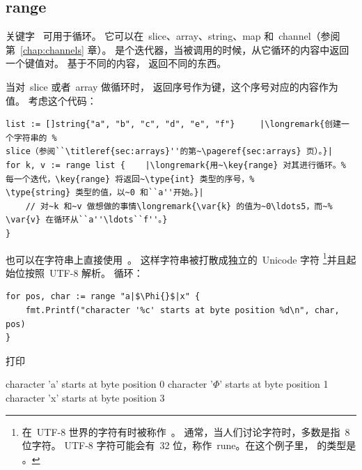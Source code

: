 \subsection{range}
关键字~ 可用于循环。
它可以在~slice、array、string、map 和~channel（参阅第~\ref{chap:channels} 章）。
 是个迭代器，当被调用的时候，从它循环的内容中返回一个键值对。
基于不同的内容， 返回不同的东西。

当对~slice 或者~array 做循环时， 返回序号作为键，这个序号对应的内容作为值。
考虑这个代码：
\begin{lstlisting}
list := []string{"a", "b", "c", "d", "e", "f"}     |\longremark{创建一个字符串的 %
slice（参阅``\titleref{sec:arrays}''的第~\pageref{sec:arrays} 页）。}|
for k, v := range list {	|\longremark{用~\key{range} 对其进行循环。%
每一个迭代，\key{range} 将返回~\type{int} 类型的序号，%
\type{string} 类型的值，以~0 和``a''开始。}|
    // 对~k 和~v 做想做的事情\longremark{\var{k} 的值为~0\ldots5，而~%
\var{v} 在循环从``a''\ldots``f''。}
}
\end{lstlisting}
\showremarks

也可以在字符串上直接使用~。
这样字符串被打散成独立的~Unicode 字符
\footnote{在~UTF-8 世界的字符有时被称作~。
通常，当人们讨论字符时，多数是指~8 位字符。
UTF-8 字符可能会有~32 位，称作~rune。在这个例子里， 的类型是 。}并且起始位按照~UTF-8 解析。
循环：
\begin{lstlisting}
for pos, char := range "a|$\Phi{}$|x" {
    fmt.Printf("character '%c' starts at byte position %d\n", char, pos)
}
\end{lstlisting}
打印
\begin{display}
character 'a' starts at byte position 0
character '\begin{math}\Phi\end{math}' starts at byte position 1
character 'x' starts at byte position 3 
\end{display}

